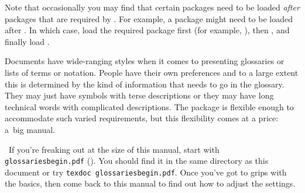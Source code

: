 \documentclass[report,inlinetitle,noprint,wbprompt,x11names]{nlctdoc}
\begin{document}
Note that occasionally you may find that certain packages need to be
loaded \emph{after} packages that are required by . For
example, a package  might need to be loaded after . In
which case, load the required package first (for example,
), then , and finally load .

\begin{important}
Documents have wide-ranging styles when it comes to presenting glossaries
or lists of terms or notation. People have their own preferences and
to a large extent this is determined by the kind of information that
needs to go in the glossary. They may just have symbols with
terse descriptions or they may have long technical words with
complicated descriptions. The  package is
flexible enough to accommodate such varied requirements, but this
flexibility comes at a price: a~big manual.

\aargh\ If you're freaking out at the size of this manual, start with
\texttt{glossariesbegin.pdf} (). You should find it in the same directory as this
document or try \texttt{texdoc glossariesbegin.pdf}. Once you've got
to grips with the basics, then come back to this manual to find out
how to adjust the settings.
\end{important}
\end{document}
